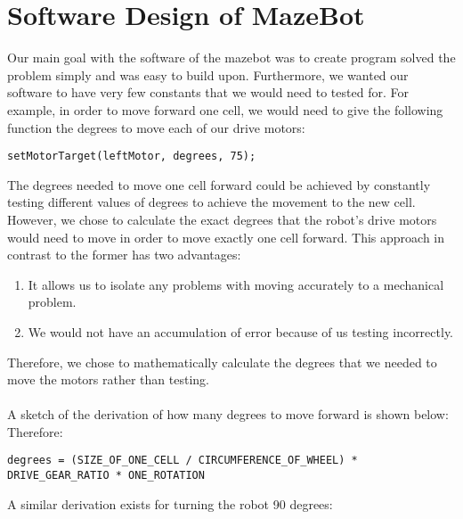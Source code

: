 \documentclass[11pt]{article}
\begin{document}
\section{Software Design of MazeBot}
Our main goal with the software of the mazebot was to create program solved the problem simply and was easy to build upon. Furthermore, we wanted our software to have very few constants that we would need to tested for. For example, in order to move forward one cell, we would need to give the following function the degrees to move each of our drive motors:
\begin{verbatim}
setMotorTarget(leftMotor, degrees, 75);
\end{verbatim}
The degrees needed to move one cell forward could be achieved by constantly testing different values of degrees to achieve the movement to the new cell. However, we chose to calculate the exact degrees that the robot's drive motors would need to move in order to move exactly one cell forward. This approach in contrast to the former has two advantages: 
\begin{enumerate}
\item It allows us to isolate any problems with moving accurately to a mechanical problem.
\item We would not have an accumulation of error because of us testing incorrectly.
\end{enumerate}
Therefore, we chose to mathematically calculate the degrees that we needed to move the motors rather than testing.\\\\
A sketch of the derivation of how many degrees to move forward is shown below: %
\\
Therefore:
\begin{verbatim}
degrees = (SIZE_OF_ONE_CELL / CIRCUMFERENCE_OF_WHEEL) * DRIVE_GEAR_RATIO * ONE_ROTATION
\end{verbatim}
A similar derivation exists for turning the robot 90 degrees: %
\newpage


\end{document}
